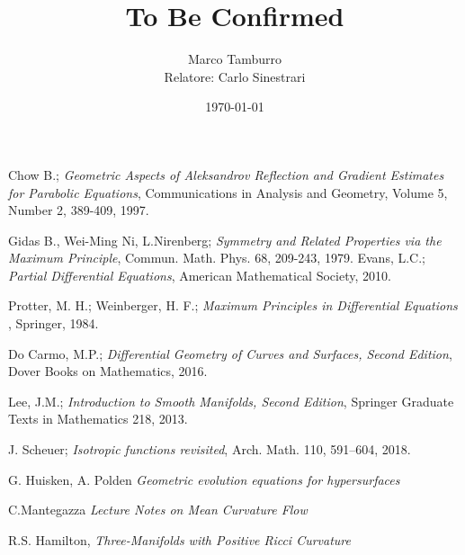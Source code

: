 \documentclass[a4paper,12pt]{book}
\author{Marco Tamburro \\ Relatore: Carlo Sinestrari}
\title{To Be Confirmed}
\date{\today}
\begin{document}
\frontmatter

\tableofcontents



\mainmatter






\backmatter


\clearpage
\begin{thebibliography}{8} 
	 Chow B.; {\em Geometric Aspects of Aleksandrov Reflection and Gradient Estimates for Parabolic Equations}, Communications in Analysis and Geometry, Volume 5, Number 2, 389-409, 1997.
	
	 Gidas B., Wei-Ming Ni, L.Nirenberg; {\em Symmetry and Related Properties via the Maximum Principle},  Commun. Math. Phys. 68, 209-243, 1979. 
	 Evans, L.C.; {\em Partial Differential Equations},  American Mathematical Society, 2010. 
	
	  Protter, M. H.;  Weinberger, H. F.; {\em Maximum Principles in Differential Equations },  Springer, 1984. 
	
	 Do Carmo, M.P.; {\em Differential Geometry of Curves and Surfaces, Second Edition},  Dover Books on Mathematics, 2016. 
	
	 Lee, J.M.; {\em Introduction to Smooth Manifolds, Second Edition},  Springer Graduate Texts in Mathematics 218, 2013. 
	
	  J. Scheuer; {\em Isotropic functions revisited},  Arch. Math. 110, 591–604, 2018.
	
	 G. Huisken, A. Polden {\em Geometric evolution equations for	hypersurfaces}
	
	 C.Mantegazza {\em Lecture Notes on Mean Curvature Flow}
	
	  R.S. Hamilton, {\em Three-Manifolds with Positive Ricci Curvature}

\end{thebibliography}
%
\end{document}

